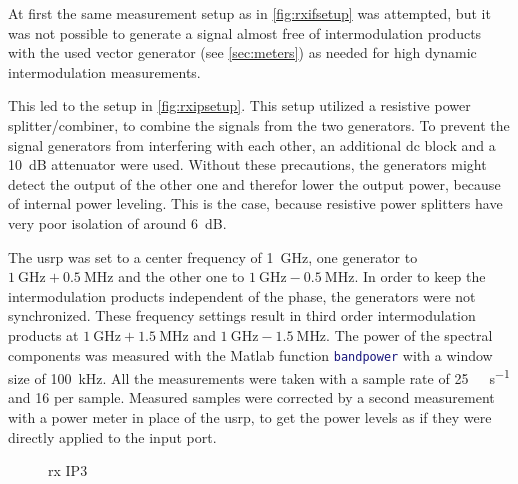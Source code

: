 \documentclass[12pt,a4paper,parskip=full,abstracton]{scrartcl}
\begin{document}
At first the same measurement setup as in \cref{fig:rxifsetup} was attempted,
but it was not possible to generate a signal almost free of intermodulation products with
the used vector generator (see \cref{sec:meters}) as needed for high dynamic intermodulation
measurements.

This led to the setup in \cref{fig:rxipsetup}. This setup utilized a resistive power
splitter/combiner, to combine the signals from the two generators. To prevent the signal
generators from interfering with each other, an additional \gls{dc} block and a
\SI{10}{\deci\bel} attenuator were used. Without these precautions, the generators
might detect the output of the other one and therefor lower the output power, because
of internal power leveling. This is the case, because resistive power splitters
have very poor isolation of around \SI{6}{\deci\bel}.

The \gls{usrp} was set to a center frequency of \SI{1}{\giga\hertz}, one generator
to $\SI{1}{\giga\hertz} + \SI{0.5}{\mega\hertz}$ and the other one to $\SI{1}{\giga\hertz}
- \SI{0.5}{\mega\hertz}$. In order to keep the intermodulation products independent of the
phase, the generators were not synchronized. These frequency settings result in third order
intermodulation products at $\SI{1}{\giga\hertz} + \SI{1.5}{\mega\hertz}$ and
$\SI{1}{\giga\hertz} - \SI{1.5}{\mega\hertz}$. The power of the spectral components was
measured with the Matlab function \lstinline[language=matlab]{bandpower} with a window
size of \SI{100}{\kilo\hertz}. All the measurements were taken with a sample rate of \SI{25}{\mega\samples\per\second}
and \SI{16}{\bit} per sample. Measured samples were corrected by a second measurement with a power meter in place of the
\gls{usrp}, to get the power levels as if they were directly applied to the input port.

\begin{figure}[htb]
    \centering
{}
    \caption{\gls{rx} IP3}
    \label{fig:rxip3}
\end{figure}
\end{document}
